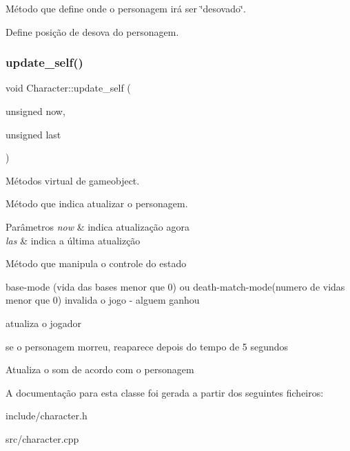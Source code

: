 Método que define onde o personagem irá ser \char`\"{}desovado\char`\"{}. 

Define posição de desova do personagem. \mbox{\label{classCharacter_a94242f85f3afb3f12dd92e02797345bd}} 
\subsubsection{\texorpdfstring{update\+\_\+self()}{update\_self()}}
{\footnotesize\ttfamily void Character\+::update\+\_\+self (\begin{DoxyParamCaption}\item[{unsigned}]{now,  }\item[{unsigned}]{last }\end{DoxyParamCaption})\hspace{0.3cm}{\ttfamily [protected]}}



Métodos virtual de gameobject. 

Método que indica atualizar o personagem.


\begin{DoxyParams}{Parâmetros}
{\em now} & indica atualização agora \\
\hline
{\em las} & indica a última atualizção \\
\hline
\end{DoxyParams}
Método que manipula o controle do estado

base-\/mode (vida das bases menor que 0) ou death-\/match-\/mode(numero de vidas menor que 0) invalida o jogo -\/ alguem ganhou

atualiza o jogador

se o personagem morreu, reaparece depois do tempo de 5 segundos

Atualiza o som de acordo com o personagem 

A documentação para esta classe foi gerada a partir dos seguintes ficheiros\+:\begin{DoxyCompactItemize}
\item 
include/character.\+h\item 
src/character.\+cpp\end{DoxyCompactItemize}
